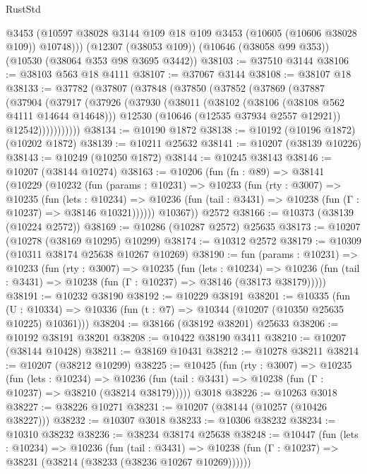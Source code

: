 \begin{lexlean}{RustStd}
\begin{coremodule}
        @3453
        (@10597 @38028 @3144 @109 @18 @109 @3453 (@10605 (@10606 @38028 @109)) @10748)))
    (@12307 (@38053 @109))
    (@10646 (@38058 @99 @353))
    (@10530 (@38064 @353 @98 @3695 @3442))
@38103 := @37510 @3144
@38106 := @38103 @563 @18 @4111
@38107 := @37067 @3144
@38108 := @38107 @18
@38133 := @37782
    (@37807
      (@37848
        (@37850
          (@37852
            (@37869
              (@37887
                (@37904
                  (@37917
                    (@37926
                      (@37930
                        (@38011
                          (@38102 (@38106 (@38108 @562 @4111 @14644 @14648)))
                          @12530
                          (@10646 (@12535 @37934 @2557 @12921))
                          @12542)))))))))))
@38134 := @10190 @1872
@38138 := @10192 (@10196 @1872) (@10202 @1872)
@38139 := @10211 @25632
@38141 := @10207 (@38139 @10226)
@38143 := @10249 (@10250 @1872)
@38144 := @10245 @38143
@38146 := @10207 (@38144 @10274)
@38163 := @10206
    (fun (fn : @89) =>
    @38141
      (@10229
        (@10232
          (fun (params : @10231) =>
          @10233
            (fun (rty : @3007) =>
            @10235
              (fun (lets : @10234) =>
              @10236 (fun (tail : @3431) => @10238 (fun (Γ : @10237) => @38146 @10321))))))
        @10367))
    @2572
@38166 := @10373 (@38139 (@10224 @2572))
@38169 := @10286 (@10287 @2572) @25635
@38173 := @10207 (@10278 (@38169 @10295) @10299)
@38174 := @10312 @2572
@38179 := @10309 (@10311 @38174 @25638 @10267 @10269)
@38190 := fun (params : @10231) =>
  @10233
    (fun (rty : @3007) =>
    @10235
      (fun (lets : @10234) =>
      @10236 (fun (tail : @3431) => @10238 (fun (Γ : @10237) => @38146 (@38173 @38179)))))
@38191 := @10232 @38190
@38192 := @10229 @38191
@38201 := @10335
    (fun (U : @10334) => @10336 (fun (t : @7) => @10344 (@10207 (@10350 @25635 @10225) @10361)))
@38204 := @38166 (@38192 @38201) @25633
@38206 := @10192 @38191 @38201
@38208 := @10422 @38190 @3411
@38210 := @10207 (@38144 @10428)
@38211 := @38169 @10431
@38212 := @10278 @38211
@38214 := @10207 (@38212 @10299)
@38225 := @10425
    (fun (rty : @3007) =>
    @10235
      (fun (lets : @10234) =>
      @10236 (fun (tail : @3431) => @10238 (fun (Γ : @10237) => @38210 (@38214 @38179)))))
    @3018
@38226 := @10263 @3018
@38227 := @38226 @10271
@38231 := @10207 (@38144 (@10257 (@10426 @38227)))
@38232 := @10307 @3018
@38233 := @10306 @38232
@38234 := @10310 @38232
@38236 := @38234 @38174 @25638
@38248 := @10447
    (fun (lets : @10234) =>
    @10236
      (fun (tail : @3431) =>
      @10238 (fun (Γ : @10237) => @38231 (@38214 (@38233 (@38236 @10267 @10269))))))

\end{coremodule}
\end{lexlean}
